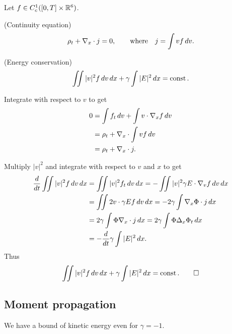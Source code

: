 \documentclass[11pt]{amsart}
\begin{document}
\begin{lem}
Let $f\in C_c^1([0,T]\times\mathbb{R}^6)$.
\begin{cond}
\item(Continuity equation)
\[\rho_t+\nabla_x\cdot j=0,\qquad\text{where}\quad j=\int vf\,dv.\]
\item(Energy conservation)
\[\iint|v|^2f\,dv\,dx+\gamma\int|E|^2\,dx=\operatorname{const}.\]
\end{cond}
\end{lem}
\begin{pfs}
\item
Integrate with respect to $v$ to get
\begin{align*}
0&=\int f_t\,dv+\int v\cdot\nabla_xf\,dv\\
&=\rho_t+\nabla_x\cdot\int vf\,dv\\
&=\rho_t+\nabla_x\cdot j.
\end{align*}
\item
Multiply $|v|^2$ and integrate with respect to $v$ and $x$ to get
\begin{align*}
\dd{t}\iint|v|^2f\,dv\,dx
&=\iint|v|^2f_t\,dv\,dx=-\iint|v|^2\gamma E\cdot\del_vf\,dv\,dx\\
&=\iint2v\cdot\gamma Ef\,dv\,dx=-2\gamma\int\del_x\Phi\cdot j\,dx\\
&=2\gamma\int\Phi\del_x\cdot j\,dx=2\gamma\int\Phi\Delta_x\Phi_t\,dx\\
&=-\dd{t}\gamma\int|E|^2\,dx.
\end{align*}
Thus
\[\iint|v|^2f\,dv\,dx+\gamma\int|E|^2\,dx=\operatorname{const}.\qedhere\]
\end{pfs}

\subsection{Moment propagation}
We have a bound of kinetic energy even for $\gamma=-1$.
\end{document}
